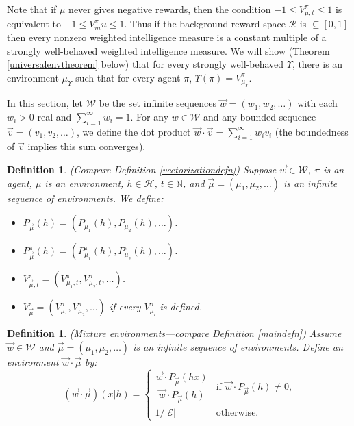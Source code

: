 \documentclass[twoside]{article}
\newtheorem{definition}[theorem]{Definition}
\begin{document}
Note that if $\mu$ never gives negative rewards, then the condition
$-1\leq V^\pi_{\mu,t}\leq 1$ is equivalent to $-1\leq V^\pi_mu\leq 1$.
Thus if the background reward-space $\mathcal R$ is $\subseteq [0,1]$
then every nonzero weighted intelligence measure
is a constant multiple of a strongly well-behaved weighted intelligence
measure.
We will show (Theorem \ref{universalenvtheorem} below)
that for every strongly well-behaved $\Upsilon$,
there is an environment $\mu_\Upsilon$ such that for every agent $\pi$,
$\Upsilon(\pi)=V^\pi_{\mu_\Upsilon}$.

In this section, let $\mathscr W$ be the set infinite sequences
$\vec w=(w_1,w_2,\ldots)$ with each $w_i>0$ real and
$\sum_{i=1}^\infty w_i=1$. For any $w\in\mathscr W$ and any
bounded sequence $\vec v=(v_1,v_2,\ldots)$, we define the dot
product $\vec w\cdot\vec v=\sum_{i=1}^\infty w_iv_i$ (the boundedness
of $\vec v$ implies this sum converges).

\begin{definition}
\label{infinitedimensionalvectorizationdefn}
    (Compare Definition \ref{vectorizationdefn})
    Suppose $\vec w\in\mathscr W$, $\pi$ is an agent, $\mu$ is an environment,
    $h\in\mathcal H$, $t\in\mathbb N$,
    and $\vec\mu=(\mu_1,\mu_2,\ldots)$ is an infinite sequence of environments.
    We define:
    \begin{itemize}
        \item
            $P_{\vec\mu}(h)=(P_{\mu_1}(h),P_{\mu_2}(h),\ldots)$.
        \item
            $P^\pi_{\vec\mu}(h)=(P^\pi_{\mu_1}(h),P^\pi_{\mu_2}(h),\ldots)$.
        \item
            $V^\pi_{\vec\mu,t}=(V^\pi_{\mu_1,t},V^\pi_{\mu_2,t},\ldots)$.
        \item
            $V^\pi_{\vec\mu}=(V^\pi_{\mu_1},V^\pi_{\mu_2},\ldots)$ if
            every $V^\pi_{\mu_i}$ is defined.
    \end{itemize}
\end{definition}

\begin{definition}
\label{mixtureenvdefn}
    (Mixture environments---compare Definition \ref{maindefn})
    Assume $\vec w\in\mathscr W$ and $\vec\mu=(\mu_1,\mu_2,\ldots)$ is an infinite
    sequence of environments. Define an environment $\vec w\cdot\vec\mu$ by:
    \[
        (\vec w\cdot \vec\mu)(x|h)
        =
        \begin{cases}
            \dfrac{\vec w\cdot P_{\vec\mu}(hx)}{\vec w\cdot P_{\vec\mu}(h)}
            &\mbox{if $\vec w\cdot P_{\vec\mu}(h)\not=0$,}\\
            1/|\mathcal E| &\mbox{otherwise.}
        \end{cases}
    \]
\end{definition}
\end{document}
